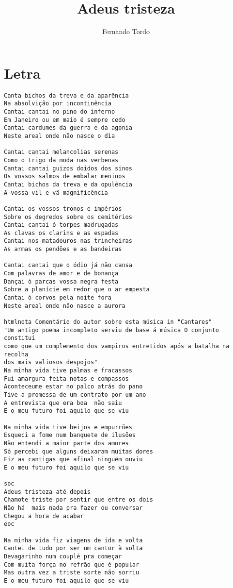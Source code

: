 \documentclass{article}
\author{Fernando Tordo}
\title{Adeus tristeza}
\begin{document}
\maketitle
\section{Letra}
\begin{verbatim}
Canta bichos da treva e da aparência
Na absolvição por incontinência
Cantai cantai no pino do inferno
Em Janeiro ou em maio é sempre cedo
Cantai cardumes da guerra e da agonia
Neste areal onde não nasce o dia

Cantai cantai melancolias serenas
Como o trigo da moda nas verbenas
Cantai cantai guizos doidos dos sinos
Os vossos salmos de embalar meninos
Cantai bichos da treva e da opulência
A vossa vil e vã magnificência

Cantai os vossos tronos e impérios
Sobre os degredos sobre os cemitérios
Cantai cantai ó torpes madrugadas
As clavas os clarins e as espadas
Cantai nos matadouros nas trincheiras
As armas os pendões e as bandeiras

Cantai cantai que o ódio já não cansa
Com palavras de amor e de bonança
Dançai ó parcas vossa negra festa
Sobre a planície em redor que o ar empesta
Cantai ó corvos pela noite fora
Neste areal onde não nasce a aurora

htmlnota Comentário do autor sobre esta música in "Cantares"
"Um antigo poema incompleto serviu de base á música O conjunto constitui
como que um complemento dos vampiros entretidos após a batalha na recolha
dos mais valiosos despojos"
Na minha vida tive palmas e fracassos
Fui amargura feita notas e compassos
Aconteceume estar no palco atrás do pano
Tive a promessa de um contrato por um ano
A entrevista que era boa  não saiu
E o meu futuro foi aquilo que se viu

Na minha vida tive beijos e empurrões
Esqueci a fome num banquete de ilusões
Não entendi a maior parte dos amores
Só percebi que alguns deixaram muitas dores
Fiz as cantigas que afinal ninguém ouviu
E o meu futuro foi aquilo que se viu

soc
Adeus tristeza até depois
Chamote triste por sentir que entre os dois
Não há  mais nada pra fazer ou conversar
Chegou a hora de acabar
eoc

Na minha vida fiz viagens de ida e volta
Cantei de tudo por ser um cantor à solta
Devagarinho num couplé pra começar
Com muita força no refrão que é popular
Mas outra vez a triste sorte não sorriu
E o meu futuro foi aquilo que se viu


\end{verbatim}
\end{document}
